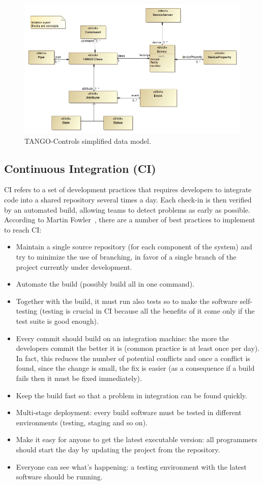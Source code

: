 \documentclass[a4paper]{spie}  %
\begin{document}
\begin{figure}[!htb]
   \centering
   \includegraphics*[width=1\columnwidth]{SimplifiedDataModel}
   \caption{TANGO-Controls simplified data model.}
   \label{fig:tangodatamodel}
\end{figure}

\subsection{Continuous Integration (CI)}
CI refers to a set of development practices that requires developers to integrate code into a shared repository several times a day. Each check-in is then verified by an automated build, allowing teams to detect problems as early as possible.
According to Martin Fowler~\cite{CI}, there are a number of best practices to implement to reach CI: 
\begin{itemize}
    \item Maintain a single source repository (for each component of the system) and try to minimize the use of branching, in favor of a single branch of the project currently under development. 
    \item Automate the build (possibly build all in one command).
    \item Together with the build, it must run also tests so to make the software self-testing (testing is crucial in CI because all the benefits of it come only if the test suite is good enough).
    \item Every commit should build on an integration machine: the more the developers commit the better it is (common practice is at least once per day). In fact, this reduces the number of potential conflicts and once a conflict is found, since the change is small, the fix is easier (as a consequence if a build fails then it must be fixed immediately).
    \item Keep the build fast so that a problem in integration can be found quickly.
    \item Multi-stage deployment: every build software must be tested in different environments (testing, staging and so on).
    \item Make it easy for anyone to get the latest executable version: all programmers should start the day by updating the project from the repository.
    \item Everyone can see what’s happening: a testing environment with the latest software should be running.
\end{itemize}
\end{document}
